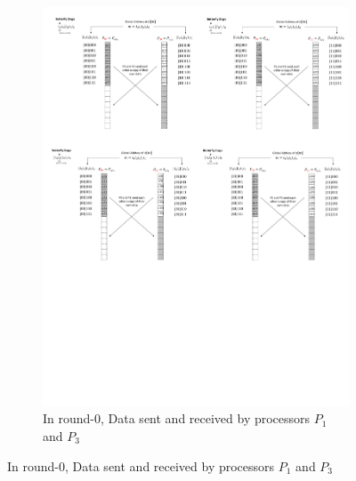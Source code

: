 \documentclass{iacrtrans}
\theoremstyle{plain}
\begin{document}
\begin{figure}[!tb]
\begin{subfigure}[b]{.47\textwidth}
\includegraphics[width=\textwidth]{./fig/DataSwapWithoutPerm2.pdf}
\caption{In round-0, Data sent and received by processors $P_1$ and $P_3$}\label{fig:dataswap_without_perm2}
\end{subfigure}


\end{figure}
\end{document}
